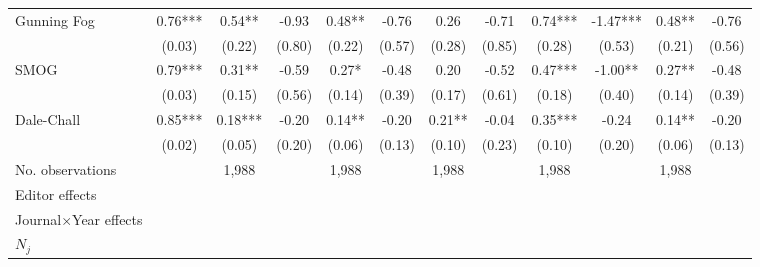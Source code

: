 \begin{sidewaystable}
\begin{threeparttable}
\begin{tabular}{p{3cm}S@{}S@{}S@{}S@{}S@{}S@{}S@{}S@{}S@{}S@{}S@{}}
            Gunning Fog                   &        0.76***&        0.54** &       -0.93   &        0.48** &       -0.76   &        0.26   &       -0.71   &        0.74***&       -1.47***&        0.48** &       -0.76   \\
                                          &      (0.03)   &      (0.22)   &      (0.80)   &      (0.22)   &      (0.57)   &      (0.28)   &      (0.85)   &      (0.28)   &      (0.53)   &      (0.21)   &      (0.56)   \\
            SMOG                          &        0.79***&        0.31** &       -0.59   &        0.27*  &       -0.48   &        0.20   &       -0.52   &        0.47***&       -1.00** &        0.27** &       -0.48   \\
                                          &      (0.03)   &      (0.15)   &      (0.56)   &      (0.14)   &      (0.39)   &      (0.17)   &      (0.61)   &      (0.18)   &      (0.40)   &      (0.14)   &      (0.39)   \\
            Dale-Chall                    &        0.85***&        0.18***&       -0.20   &        0.14** &       -0.20   &        0.21** &       -0.04   &        0.35***&       -0.24   &        0.14** &       -0.20   \\
                                          &      (0.02)   &      (0.05)   &      (0.20)   &      (0.06)   &      (0.13)   &      (0.10)   &      (0.23)   &      (0.10)   &      (0.20)   &      (0.06)   &      (0.13)   \\
            \midrule
            No. observations              &               &       1,988   &               &       1,988   &               &       1,988   &               &       1,988   &               &       1,988   &               \\
            \midrule
            Editor effects       &               &           {}   &               &           {}   &               &           {}   &               &           {}   &               &               &               \\
            Journal\(\times\)Year effects          &               &           {}   &               &           {}   &               &           {}   &               &           {}   &               &               &               \\
            \(N_j\)                       &               &           {}   &               &           {}   &               &           {}   &               &           {}   &               &               &               \\

\end{tabular}
\end{threeparttable}
\end{sidewaystable}
